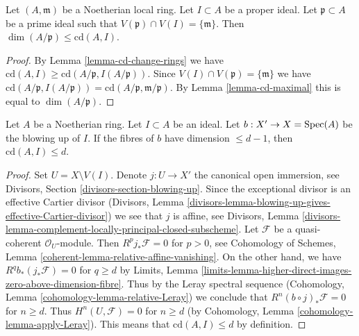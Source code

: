 \begin{lemma}
\label{lemma-cd-bound-dim-local}
Let $(A, \mathfrak m)$ be a Noetherian local ring.
Let $I \subset A$ be a proper ideal.
Let $\mathfrak p \subset A$ be a prime ideal
such that $V(\mathfrak p) \cap V(I) = \{\mathfrak m\}$.
Then $\dim(A/\mathfrak p) \leq \text{cd}(A, I)$.
\end{lemma}

\begin{proof}
By Lemma \ref{lemma-cd-change-rings} we have
$\text{cd}(A, I) \geq \text{cd}(A/\mathfrak p, I(A/\mathfrak p))$.
Since $V(I) \cap V(\mathfrak p) = \{\mathfrak m\}$ we have
$\text{cd}(A/\mathfrak p, I(A/\mathfrak p)) =
\text{cd}(A/\mathfrak p, \mathfrak m/\mathfrak p)$.
By Lemma \ref{lemma-cd-maximal} this is equal to $\dim(A/\mathfrak p)$.
\end{proof}

\begin{lemma}
\label{lemma-cd-blowup}
Let $A$ be a Noetherian ring. Let $I \subset A$ be an ideal.
Let $b : X' \to X = \mathop{\mathrm{Spec}}(A)$ be the blowing up of $I$.
If the fibres of $b$ have dimension $\leq d - 1$, then
$\text{cd}(A, I) \leq d$.
\end{lemma}

\begin{proof}
Set $U = X \setminus V(I)$. Denote $j : U \to X'$ the canonical open
immersion, see Divisors, Section \ref{divisors-section-blowing-up}.
Since the exceptional divisor is an effective Cartier divisor
(Divisors, Lemma
\ref{divisors-lemma-blowing-up-gives-effective-Cartier-divisor})
we see that $j$ is affine, see
Divisors, Lemma
\ref{divisors-lemma-complement-locally-principal-closed-subscheme}.
Let $\mathcal{F}$ be a quasi-coherent $\mathcal{O}_U$-module.
Then $R^pj_*\mathcal{F} = 0$ for $p > 0$, see
Cohomology of Schemes, Lemma
\ref{coherent-lemma-relative-affine-vanishing}.
On the other hand, we have $R^qb_*(j_*\mathcal{F}) = 0$ for
$q \geq d$ by Limits, Lemma
\ref{limits-lemma-higher-direct-images-zero-above-dimension-fibre}.
Thus by the Leray spectral sequence
(Cohomology, Lemma \ref{cohomology-lemma-relative-Leray})
we conclude that $R^n(b \circ j)_*\mathcal{F} = 0$ for
$n \geq d$. Thus $H^n(U, \mathcal{F}) = 0$ for $n \geq d$
(by Cohomology, Lemma \ref{cohomology-lemma-apply-Leray}).
This means that $\text{cd}(A, I) \leq d$ by definition.
\end{proof}







